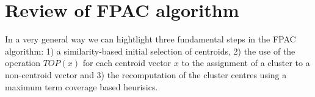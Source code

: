 \documentclass[runningheads]{llncs}
\begin{document}
%
%
%
%
%
%

\section{Review of FPAC algorithm}


In a very general way we can hightlight three fundamental
steps in the FPAC algorithm: 1) a similarity-based initial selection of centroids, 2) the use of the operation $TOP(x)$ for each centroid vector $x$ to the assignment of a cluster to a non-centroid vector and 3) the recomputation of the cluster centres using a maximum term
coverage based heurisics.
\end{document}
